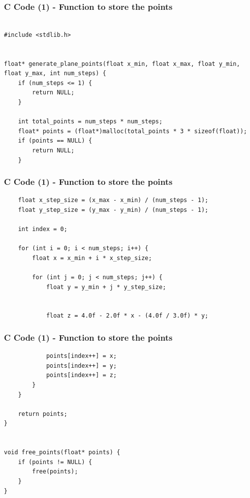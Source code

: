 \documentclass{beamer}
\begin{document}
\begin{frame}[fragile]
    \frametitle{C Code (1) - Function to store the points }

    \begin{lstlisting}

#include <stdlib.h>


float* generate_plane_points(float x_min, float x_max, float y_min, float y_max, int num_steps) {
    if (num_steps <= 1) { 
        return NULL;
    }

    int total_points = num_steps * num_steps;
    float* points = (float*)malloc(total_points * 3 * sizeof(float));
    if (points == NULL) {
        return NULL; 
    }
    \end{lstlisting}
\end{frame}
\begin{frame}[fragile]
    \frametitle{C Code (1) - Function to store the points }

    \begin{lstlisting}
    float x_step_size = (x_max - x_min) / (num_steps - 1);
    float y_step_size = (y_max - y_min) / (num_steps - 1);

    int index = 0;
   
    for (int i = 0; i < num_steps; i++) {
        float x = x_min + i * x_step_size;
        
        for (int j = 0; j < num_steps; j++) {
            float y = y_min + j * y_step_size;

          
            float z = 4.0f - 2.0f * x - (4.0f / 3.0f) * y;

    \end{lstlisting}
\end{frame}
\begin{frame}[fragile]
    \frametitle{C Code (1) - Function to store the points }

    \begin{lstlisting}
            points[index++] = x;
            points[index++] = y;
            points[index++] = z;
        }
    }

    return points;
}


void free_points(float* points) {
    if (points != NULL) {
        free(points);
    }
}




    \end{lstlisting}
\end{frame}
\end{document}
